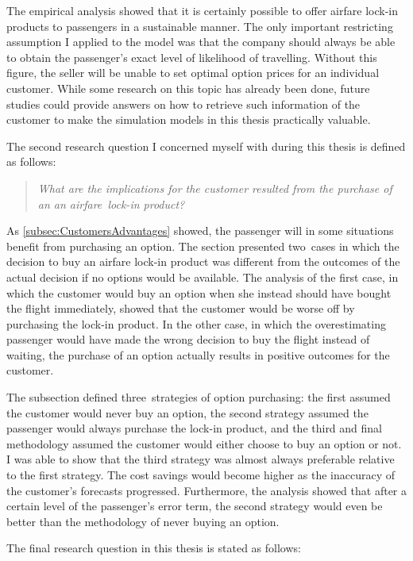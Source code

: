The empirical analysis showed that it is certainly possible to offer airfare lock-in products to passengers in a sustainable manner. The only important restricting assumption I applied to the model was that the company should always be able to obtain the passenger's exact level of likelihood of travelling. Without this figure, the seller will be unable to set optimal option prices for an individual customer. While some research on this topic has already been done, future studies could provide answers on how to retrieve such information of the customer to make the simulation models in this thesis practically valuable.

The second research question I concerned myself with during this thesis is defined as follows:

\begin{quote}\emph{What are the implications for the customer resulted from the purchase of an an airfare~lock-in product?}\end{quote}

As \autoref{subsec:CustomersAdvantages} showed, the passenger will in some situations benefit from purchasing an option. The section presented two~cases in which the decision to buy an airfare lock-in product was different from the outcomes of the actual decision if no options would be available. The analysis of the first case, in which the customer would buy an option when she instead should have bought the flight immediately, showed that the customer would be worse off by purchasing the lock-in product. In the other case, in which the overestimating passenger would have made the wrong decision to buy the flight instead of waiting, the purchase of an option actually results in positive outcomes for the customer.

The subsection defined three~strategies of option purchasing: the first assumed the customer would never buy an option, the second strategy assumed the passenger would always purchase the lock-in product, and the third and final methodology assumed the customer would either choose to buy an option or not. I was able to show that the third strategy was almost always preferable relative to the first strategy. The cost savings would become higher as the inaccuracy of the customer's forecasts progressed. Furthermore, the analysis showed that after a certain level of the passenger's error term, the second strategy would even be better than the methodology of never buying an option.

The final research question in this thesis is stated as follows:

